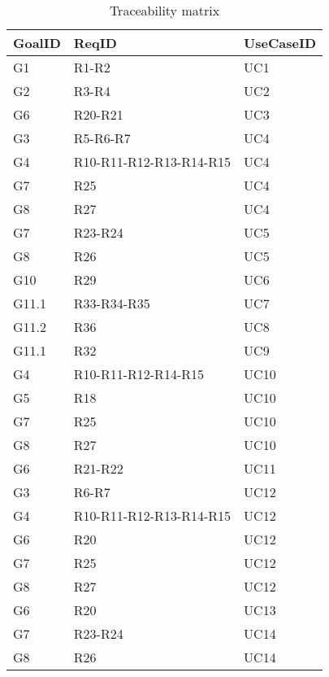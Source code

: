 \begin{table}[H]
	\begin{center}
		\begin{tabular}{ | p{} | p{} | p{} | }
		\hline
		\textbf{GoalID} & \textbf{ReqID} & \textbf{UseCaseID}\\
		\hline
		G1 & R1-R2 & UC1\\
		\hline
		G2 & R3-R4 & UC2\\
		\hline
		G6 & R20-R21 & UC3\\
		\hline
		G3 & R5-R6-R7 & UC4\\
		\hline
		G4 & R10-R11-R12-R13-R14-R15 & UC4\\
		\hline
		G7 & R25 & UC4\\
		\hline
		G8 & R27 & UC4\\
		\hline
		G7 & R23-R24 & UC5\\
		\hline
		G8 & R26 & UC5\\
		\hline
		G10 & R29 & UC6\\
		\hline
		G11.1 & R33-R34-R35 & UC7\\
		\hline
		G11.2 & R36 & UC8\\
		\hline
		G11.1 & R32 & UC9\\
		\hline
		G4 & R10-R11-R12-R14-R15 & UC10\\
		\hline
		G5 & R18 & UC10\\
		\hline
		G7 & R25 & UC10\\
		\hline
		G8 & R27 & UC10\\
		\hline
		G6 & R21-R22 & UC11\\
		\hline
		G3 & R6-R7 & UC12\\
		\hline
		G4 & R10-R11-R12-R13-R14-R15 & UC12\\
		\hline
		G6 & R20 & UC12\\
		\hline
		G7 & R25 & UC12\\
		\hline
		G8 & R27 & UC12\\
		\hline
		G6 & R20 & UC13\\
		\hline
		G7 & R23-R24 & UC14\\
		\hline
		G8 & R26 & UC14\\
		\hline
		\end{tabular}
	\end{center}
	\caption{Traceability matrix}
\end{table}